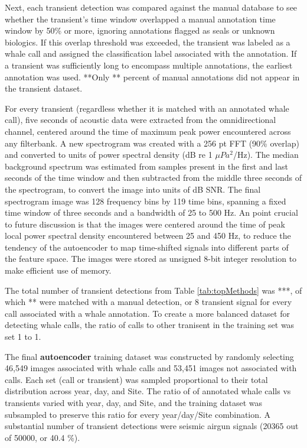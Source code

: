 \documentclass[preprint,NumberedRefs]{JASAnew}
\begin{document}
Next, each transient detection was compared against the manual database to see whether the transient's time window overlapped a manual annotation time window by 50\% or more, ignoring annotations flagged as seals or unknown biologics.  If this overlap threshold was exceeded, the transient was labeled as a whale call and assigned the classification label associated with the annotation.  If a transient was sufficiently long to encompass multiple annotations, the earliest annotation was used.  **Only ** percent of manual annotations did not appear in the transient dataset.

For every transient (regardless whether it is matched with an annotated whale call), five seconds of acoustic data were extracted from the omnidirectional channel, centered around the time of maximum peak power encountered across any filterbank.  A new spectrogram was created with a 256 pt FFT (90\% overlap) and converted to units of power spectral density (dB re 1 $\mu Pa^2$/Hz).  The median background spectrum was estimated from samples present in the first and last seconds of the time window and then subtracted from the middle three seconds of the spectrogram, to convert the image into units of dB SNR.  The final spectrogram image was 128 frequency bins by 119 time bins, spanning a fixed time window of three seconds and a bandwidth of 25 to 500 Hz.  An point crucial to future discussion is that the images were centered around the time of peak local power spectral density encountered between 25 and 450 Hz, to reduce the tendency of the autoencoder to map time-shifted signals into different parts of the feature space.  The images were stored as unsigned 8-bit integer resolution to make efficient use of memory.

The total number of transient detections from Table \ref{tab:topMethods} was ***, of which ** were matched with a manual detection, or 8 transient signal for every call associated with a whale annotation.  To create a more balanced dataset for detecting whale calls, the ratio of calls to other tranisent in the training set was set 1 to 1.

The final \textbf{autoencoder} training dataset was constructed by randomly selecting 46,549 images associated with whale calls and 53,451 images not associated with calls. Each set (call or transient) was sampled proportional to their total distribution across year, day, and Site. The ratio of of annotated whale calls vs transients varied with year, day, and Site, and the training dataset was subsampled to preserve this ratio for every year/day/Site combination. 
A substantial number of transient detections were seismic airgun signals (20365 out of 50000, or 40.4 \%).
\end{document}
